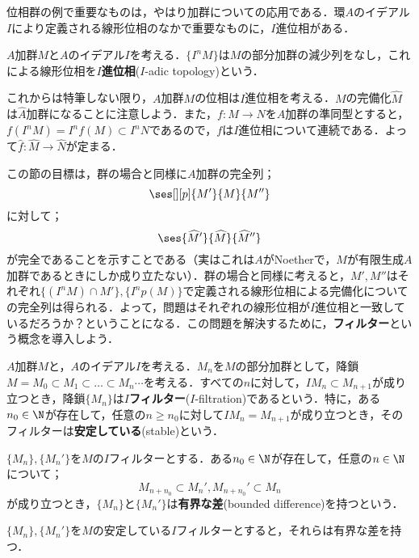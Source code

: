 位相群の例で重要なものは，やはり加群についての応用である．環$A$のイデアル$I$により定義される線形位相のなかで重要なものに，$I$進位相がある．

\begin{defi}[$I$進位相]
	$A$加群$M$と$A$のイデアル$I$を考える．$\{I^nM\}$は$M$の部分加群の減少列をなし，これによる線形位相を$I$\textbf{進位相}($I$-adic topology)という．
\end{defi}

これからは特筆しない限り，$A$加群$M$の位相は$I$進位相を考える．$M$の完備化$\widehat{M}$は$\widehat{A}$加群になることに注意しよう．また，$f:M\to N$を$A$加群の準同型とすると，$f(I^nM)=I^nf(M)\subset I^nN$であるので，$f$は$I$進位相について連続である．よって$\widehat{f}:\widehat{M}\to\widehat{N}$が定まる．

この節の目標は，群の場合と同様に$A$加群の完全列；
\[\ses[][p]{M'}{M}{M''}\]
に対して；
\[\ses{\widehat{M}'}{\widehat{M}}{\widehat{M}''}\]
が完全であることを示すことである（実はこれは$A$がNoetherで，$M$が有限生成$A$加群であるときにしか成り立たない）．群の場合と同様に考えると，$M',M''$はそれぞれ$\{(I^nM)\cap M'\},\{I^n p(M)\}$で定義される線形位相による完備化についての完全列は得られる．よって，問題はそれぞれの線形位相が$I$進位相と一致しているだろうか？ということになる．この問題を解決するために，\textbf{フィルター}という概念を導入しよう．

\begin{defi}[$I$フィルター]
	$A$加群$M$と，$A$のイデアル$I$を考える．$M_n$を$M$の部分加群として，降鎖$M=M_0\subset M_1\subset\dots\subset M_n\cdots$を考える．すべての$n$に対して，$IM_n\subset M_{n+1}$が成り立つとき，降鎖$\{M_n\}$は$I$\textbf{フィルター}($I$-filtration)であるという．特に，ある$n_0\in\N$が存在して，任意の$n\geq n_0$に対して$IM_n=M_{n+1}$が成り立つとき，そのフィルターは\textbf{安定している}(stable)という．
\end{defi}

\begin{defi}[有界な差]
	$\{M_n\},\{M_n'\}$を$M$の$I$フィルターとする．ある$n_0\in\N$が存在して，任意の$n\in\N$について；
	\[M_{n+n_0}\subset M_n',M_{n+n_0}'\subset M_n\]
	が成り立つとき，$\{M_n\}$と$\{M_n'\}$は\textbf{有界な差}(bounded difference)を持つという．
\end{defi}

\begin{lem}\label{lem:安定しているフィルターは有界な差を持つ}
	$\{M_n\},\{M_n'\}$を$M$の安定している$I$フィルターとすると，それらは有界な差を持つ．
\end{lem}

